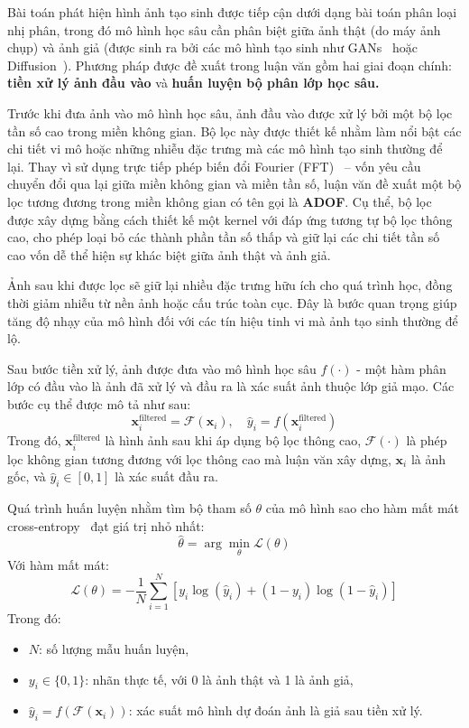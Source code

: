 Bài toán phát hiện hình ảnh tạo sinh được tiếp cận dưới dạng bài toán phân loại nhị phân, trong đó mô hình học sâu cần phân biệt giữa ảnh thật (do máy ảnh chụp) và ảnh giả (được sinh ra bởi các mô hình tạo sinh như GANs~\cite{Goodfellow2014GenerativeAN} hoặc Diffusion~\cite{Ho2020DenoisingDP}). Phương pháp được đề xuất trong luận văn gồm hai giai đoạn chính: \textbf{tiền xử lý ảnh đầu vào} và \textbf{huấn luyện bộ phân lớp học sâu.}

Trước khi đưa ảnh vào mô hình học sâu, ảnh đầu vào được xử lý bởi một bộ lọc tần số cao trong miền không gian. Bộ lọc này được thiết kế nhằm làm nổi bật các chi tiết vi mô hoặc những nhiễu đặc trưng mà các mô hình tạo sinh thường để lại. Thay vì sử dụng trực tiếp phép biến đổi Fourier (FFT)~\cite{Arunachalam2013TheFF} – vốn yêu cầu chuyển đổi qua lại giữa miền không gian và miền tần số, luận văn đề xuất một bộ lọc tương đương trong miền không gian có tên gọi là \textbf{ADOF}. Cụ thể, bộ lọc được xây dựng bằng cách thiết kế một kernel với đáp ứng tương tự bộ lọc thông cao, cho phép loại bỏ các thành phần tần số thấp và giữ lại các chi tiết tần số cao vốn dễ thể hiện sự khác biệt giữa ảnh thật và ảnh giả.

Ảnh sau khi được lọc sẽ giữ lại nhiều đặc trưng hữu ích cho quá trình học, đồng thời giảm nhiễu từ nền ảnh hoặc cấu trúc toàn cục. Đây là bước quan trọng giúp tăng độ nhạy của mô hình đối với các tín hiệu tinh vi mà ảnh tạo sinh thường để lộ.

Sau bước tiền xử lý, ảnh được đưa vào mô hình học sâu \( f(\cdot) \) - một hàm phân lớp có đầu vào là ảnh đã xử lý và đầu ra là xác suất ảnh thuộc lớp giả mạo. Các bước cụ thể được mô tả như sau:
\[
\mathbf{x}_i^{\text{filtered}} = \mathcal{F}(\mathbf{x}_i), \quad \hat{y}_i = f(\mathbf{x}_i^{\text{filtered}})
\]
Trong đó,
\(\mathbf{x}_i^{\text{filtered}}\) là hình ảnh sau khi áp dụng bộ lọc thông cao,
\( \mathcal{F}(\cdot) \) là phép lọc không gian tương đương với lọc thông cao mà luận văn xây dựng,
\( \mathbf{x}_i \) là ảnh gốc, và \( \hat{y}_i \in [0,1] \) là xác suất đầu ra.

Quá trình huấn luyện nhằm tìm bộ tham số \( \theta \) của mô hình sao cho hàm mất mát cross-entropy~\cite{2023arXiv230407288M} đạt giá trị nhỏ nhất:
\[
\hat{\theta} = \arg \min_{\theta} \mathcal{L}(\theta)
\]
Với hàm mất mát:
\[
\mathcal{L}(\theta) = -\frac{1}{N} \sum_{i=1}^{N} \left[ y_i \log(\hat{y}_i) + (1 - y_i) \log(1 - \hat{y}_i) \right]
\]
Trong đó:
\begin{itemize}
	\item \( N \): số lượng mẫu huấn luyện,
	\item \( y_i \in \{0, 1\} \): nhãn thực tế, với 0 là ảnh thật và 1 là ảnh giả,
	\item \( \hat{y}_i = f(\mathcal{F}(\mathbf{x}_i)) \): xác suất mô hình dự đoán ảnh là giả sau tiền xử lý.
\end{itemize}

